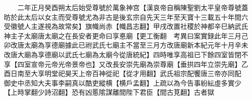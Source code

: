 　　二年正月癸酉朔太后始受尊號於萬象神宫【漢哀帝自稱陳聖劉太平皇帝尊號蓋昉於此太后以女主而受尊號尤為非古是後玄宗自先天三年至天寶十三載五十年間六受徽號人主遂視為故常矣】旗幟尚赤【幟昌志翻】甲戌改置社稷於神都辛巳納武氏神主子太廟唐太廟之在長安者更命曰享悳廟【更工衡翻　考異曰案實録此年三月己卯改唐太廟為享德廟據此已祔武氏七廟主不當至三月方改唐廟新本紀元年十月辛未改唐大廟為享德廟以武氏七廟為太廟今從唐統紀】四時唯享高祖已下餘四室皆閉不享【四室宣帝元帝光帝景帝也】又改長安崇先廟為崇尊廟【垂拱四年立崇先廟】乙酉日南至大享明堂祀昊天上帝百神從祀【從才用翻】武氏祖宗配饗唐三帝亦同配　御史中丞知大夫事李嗣真以酷吏縱横【横戶孟翻】上疏以為今告事紛紜虛多實少【上時掌翻少詩沼翻】恐有凶慝隂謀離間陛下君臣【間古莧翻】古者獄